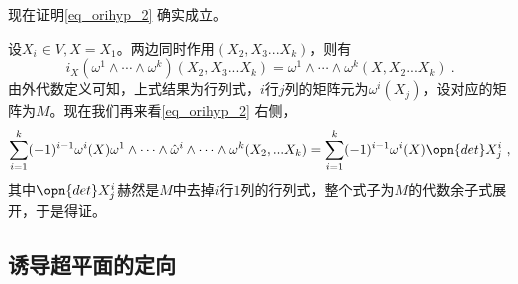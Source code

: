 现在证明\autoref{eq_orihyp_2} 确实成立。

设$X_i\in V,X=X_1$。两边同时作用$(X_2,X_3...X_k)$，则有
\begin{equation}
i_X(\omega^1\wedge\cdots\wedge\omega^k)(X_2,X_3...X_k)=\omega^1\wedge\cdots\wedge\omega^k(X,X_2...X_k)~.
\end{equation}
由外代数定义可知，上式结果为行列式，$i$行$j$列的矩阵元为$\omega^i(X_j)$，设对应的矩阵为$M$。现在我们再来看\autoref{eq_orihyp_2} 右侧，
\begin{equation}
\begin{aligned}
\sum_{i=1}^k(-1)^{i-1} \omega^i(X) \omega^1 \wedge \cdots \wedge \hat{\omega}^i \wedge \cdots \wedge \omega^k(X_2,...X_k)=\sum_{i=1}^k(-1)^{i-1} \omega^i(X) \opn{det}X^i_j~,
\end{aligned}
\end{equation}
其中$\opn{det}X^i_j$赫然是$M$中去掉$i$行$1$列的行列式，整个式子为$M$的代数余子式展开，于是得证。

\subsection{诱导超平面的定向}
